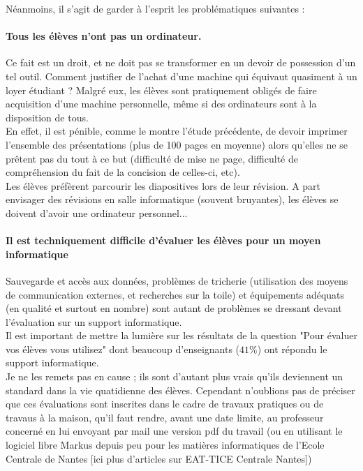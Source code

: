 \documentclass[a4paper,11pt,french]{article}
\begin{document}
Néanmoins, il s'agit de garder à l'esprit les problématiques suivantes :

\paragraph{Tous les élèves n'ont pas un ordinateur.}
Ce fait est un droit, et ne doit pas se transformer en un devoir de possession d'un tel outil. Comment justifier de l'achat d'une machine qui équivaut quasiment à un loyer étudiant ? Malgré eux, les élèves sont pratiquement obligés de faire acquisition d'une machine personnelle, même si des ordinateurs sont à la disposition de tous.\\

En effet, il est pénible, comme le montre l'étude précédente, de devoir imprimer l'ensemble des présentations (plus de 100 pages en moyenne) alors qu'elles ne se prêtent pas du tout à ce but (difficulté de mise ne page, difficulté de compréhension du fait de la concision de celles-ci, etc).\\

Les élèves préfèrent parcourir les diapositives lors de leur révision. A part envisager des révisions en salle informatique (souvent bruyantes), les élèves se doivent d'avoir une ordinateur personnel...\\

\paragraph{Il est techniquement difficile d'évaluer les élèves pour un moyen informatique}
Sauvegarde et accès aux données, problèmes de tricherie (utilisation des moyens de communication externes, et recherches sur la toile) et équipements adéquats (en qualité et surtout en nombre) sont autant de problèmes se dressant devant l'évaluation sur un support informatique.\\

Il est important de mettre la lumière sur les résultats de la question "Pour évaluer vos élèves vous utilisez" dont beaucoup d'enseignants ($41\%$) ont répondu le support informatique.\\

Je ne les remets pas en cause ; ils sont d'autant plus vrais qu'ils deviennent un standard dans la vie quatidienne des élèves. Cependant n'oublions pas de préciser que ces évaluations sont inscrites dans le cadre de travaux pratiques ou de travaus à la maison, qu'il faut rendre, avant une date limite, au professeur concerné en lui envoyant par mail une version pdf du travail (ou en utilisant le logiciel libre Markus depuis peu pour les matières informatiques de l'Ecole Centrale de Nantes [ici plus d'articles sur EAT-TICE Centrale Nantes])\\
\end{document}
